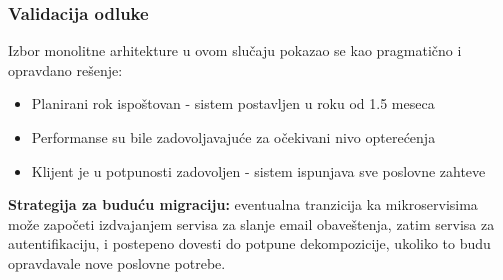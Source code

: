 \documentclass[12pt]{article}
\begin{document}
    \newpage

    \subsubsection*{Validacija odluke}

    Izbor monolitne arhitekture u ovom slučaju pokazao se kao pragmatično i opravdano rešenje:
    \begin{itemize}
    \item Planirani rok ispoštovan - sistem postavljen u roku od 1.5 meseca
    \item Performanse su bile zadovoljavajuće za očekivani nivo opterećenja
    \item Klijent je u potpunosti zadovoljen - sistem ispunjava sve poslovne zahteve
    \end{itemize}

    \textbf{Strategija za buduću migraciju:} eventualna tranzicija ka mikroservisima može započeti izdvajanjem servisa za slanje email obaveštenja, zatim servisa za autentifikaciju, i postepeno dovesti do potpune dekompozicije, ukoliko to budu opravdavale nove poslovne potrebe.



\newpage
\printbibliography[title={Literatura}]
\end{document}
